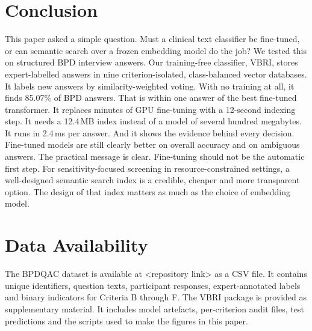 \documentclass[11pt]{article}
\newcommand{\vbri}{VBRI}
\newcommand{\bpdqac}{BPDQAC}
\begin{document}
\section{Conclusion}\label{sec:conclusion}

This paper asked a simple question. Must a clinical text classifier be fine-tuned, or can semantic
search over a frozen embedding model do the job? We tested this on structured BPD interview answers.
Our training-free classifier, \vbri{}, stores expert-labelled answers in nine criterion-isolated,
class-balanced vector databases. It labels new answers by similarity-weighted voting. With no
training at all, it finds 85.07\% of BPD answers. That is within one answer of the best fine-tuned
transformer. It replaces minutes of GPU fine-tuning with a 12-second indexing step. It needs a 12.4\,MB
index instead of a model of several hundred megabytes. It runs in 2.4\,ms per answer. And it shows
the evidence behind every decision. Fine-tuned models are still clearly better on overall accuracy
and on ambiguous answers. The practical message is clear. Fine-tuning should not be the automatic
first step. For sensitivity-focused screening in resource-constrained settings, a well-designed
semantic search index is a credible, cheaper and more transparent option. The design of that index
matters as much as the choice of embedding model.

\section*{Data Availability}

The \bpdqac{} dataset is available at \textless{}repository link\textgreater{} as a CSV file. It
contains unique identifiers, question texts, participant responses, expert-annotated labels and
binary indicators for Criteria B through F. The \vbri{} package is provided as supplementary
material. It includes model artefacts, per-criterion audit files, test predictions and the scripts
used to make the figures in this paper.

\printbibliography
\end{document}
